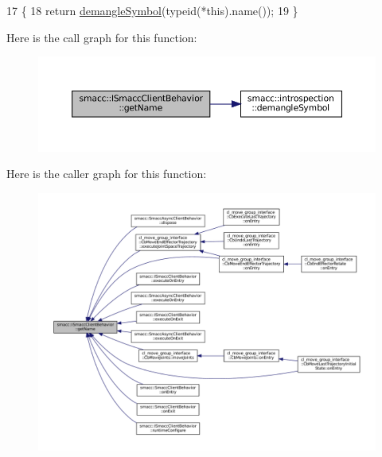 \begin{DoxyCode}
17 \{
18   \textcolor{keywordflow}{return} \hyperlink{namespacesmacc_1_1introspection_a2f495108db3e57604d8d3ff5ef030302}{demangleSymbol}(\textcolor{keyword}{typeid}(*this).name());
19 \}
\end{DoxyCode}
Here is the call graph for this function\+:
\nopagebreak
\begin{figure}[H]
\begin{center}
\leavevmode
\includegraphics[width=350pt]{classsmacc_1_1ISmaccClientBehavior_a18e4bec9460b010f2894c0f7e7064a34_cgraph}
\end{center}
\end{figure}
Here is the caller graph for this function\+:
\nopagebreak
\begin{figure}[H]
\begin{center}
\leavevmode
\includegraphics[width=350pt]{classsmacc_1_1ISmaccClientBehavior_a18e4bec9460b010f2894c0f7e7064a34_icgraph}
\end{center}
\end{figure}
\mbox{\label{classsmacc_1_1ISmaccClientBehavior_ad066319af26db612ba2b6d2f1796daad}} 
